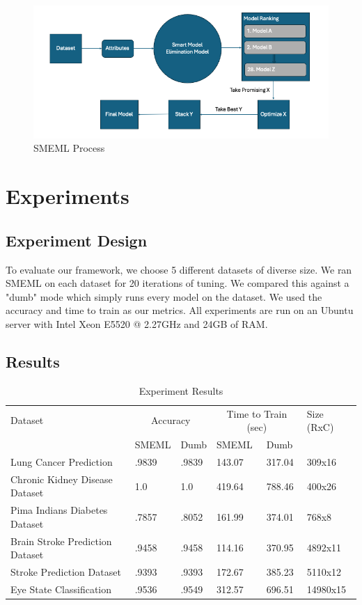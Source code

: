 \documentclass{article}
\begin{document}
\begin {figure}
\centering
\includegraphics[width=\textwidth]{smeml-flowchart.png}
\caption{SMEML Process}
\end{figure}

\section{Experiments}
\subsection{Experiment Design}
To evaluate our framework, we choose 5 different datasets of diverse size. We ran SMEML on each dataset for 20 iterations of tuning. We compared this against a "dumb" mode which simply runs every model on the dataset. We used the accuracy and time to train as our metrics. All experiments are run on an Ubuntu server with Intel Xeon E5520 @ 2.27GHz and 24GB of RAM.

\subsection{Results}
\begin{table}
  \caption{Experiment Results}
  \label{model-options-table}
  \centering
  \begin{tabular}{llllll}
    \toprule
    Dataset & \multicolumn{2}{c}{Accuracy} & \multicolumn{2}{c}{Time to Train (sec)} & Size (RxC)\\
    \cmidrule(lr){2-3} \cmidrule(lr){4-5}
    & SMEML & Dumb & SMEML & Dumb \\
    \midrule
    Lung Cancer Prediction & .9839 & .9839 & 143.07 & 317.04 & 309x16\\
    Chronic Kidney Disease Dataset & 1.0 & 1.0 & 419.64 & 788.46 & 400x26\\
    Pima Indians Diabetes Dataset & .7857 & .8052 & 161.99 & 374.01 & 768x8 \\
    Brain Stroke Prediction Dataset & .9458 & .9458 & 114.16 & 370.95 & 4892x11\\
    Stroke Prediction Dataset & .9393 & .9393 & 172.67 & 385.23 & 5110x12 \\
    Eye State Classification & .9536 & .9549 & 312.57 & 696.51 & 14980x15\\ 
    \bottomrule
  \end{tabular}
\end{table}
\end{document}
